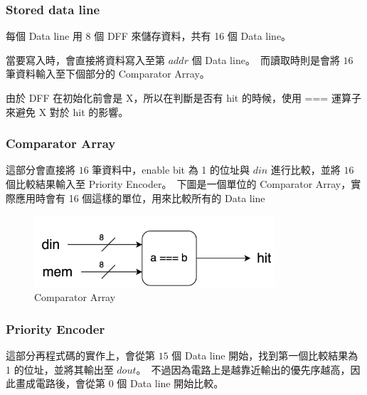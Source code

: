 \documentclass[10.5pt,compsoc,UTF8]{CjC}
\theoremstyle{mystyle}
\begin{document}
\subsubsection*{Stored data line}
每個 Data line 用 8 個 DFF 來儲存資料，共有 16 個 Data line。
\par
當要寫入時，會直接將資料寫入至第 $addr$ 個 Data line。\
而讀取時則是會將 $16$ 筆資料輸入至下個部分的 Comparator Array。
\par
由於 DFF 在初始化前會是 X，所以在判斷是否有 hit 的時候，使用 === 運算子來避免 X 對於 hit 的影響。

\subsubsection*{Comparator Array}
這部分會直接將 $16$ 筆資料中，enable bit 為 1 的位址與 $din$ 進行比較，並將 $16$ 個比較結果輸入至 Priority Encoder。\
下圖是一個單位的 Comparator Array，實際應用時會有 16 個這樣的單位，用來比較所有的 Data line

\begin{figure}[h!]
  \centering
  \includegraphics[width=0.8\textwidth]{./img/Q1-CA.png}
  \caption{Comparator Array}
  \label{fig:CA}
\end{figure}

\newpage
\subsubsection*{Priority Encoder}
這部分再程式碼的實作上，會從第 $15$ 個 Data line 開始，找到第一個比較結果為 1 的位址，並將其輸出至 $dout$。\
不過因為電路上是越靠近輸出的優先序越高，因此畫成電路後，會從第 $0$ 個 Data line 開始比較。
\end{document}
